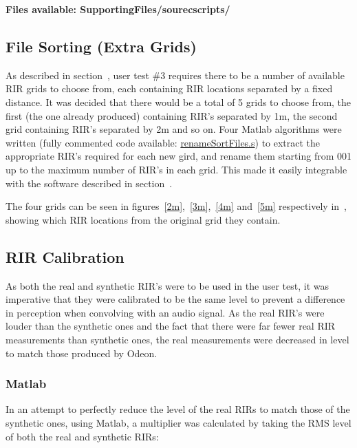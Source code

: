 \documentclass[../../main.tex]{subfiles}
\begin{document}
			\textbf{Files available: SupportingFiles/sourecscripts/}

	\subsection{File Sorting (Extra Grids)}
	\label{odeon:grids}
		As described in section~, user test \#3 requires there to be a number of available \ac{RIR} grids to choose from, each containing \ac{RIR} locations separated by a fixed distance. It was decided that there would be a total of 5 grids to choose from, the first (the one already produced) containing \ac{RIR}'s separated by 1m, the second grid containing \ac{RIR}'s separated by 2m and so on.	 Four Matlab algorithms were written (fully commented code available: \href{http://lt669.github.io/code/matlab/html/renameSortFiles.html}{renameSortFiles.s})  to extract the appropriate \ac{RIR}'s required for each new gird, and rename them starting from 001 up to the maximum number of \ac{RIR}'s in each grid. This made it easily  integrable with the software described in section~.

		The four grids can be seen in figures~\ref{2m},~\ref{3m},~\ref{4m} and~\ref{5m} respectively in~, showing which \ac{RIR} locations from the original grid they contain.


	\subsection{RIR Calibration}
		
		As both the real and synthetic \ac{RIR}'s were to be used in the user test, it was imperative that they were calibrated to be the same level to prevent a difference in perception when convolving with an audio signal. As the real \ac{RIR}'s were louder than the synthetic ones and the fact that there were far fewer real \ac{RIR} measurements than synthetic ones, the real measurements were decreased in level to match those produced by Odeon.

		\subsubsection{Matlab}

		In an attempt to perfectly reduce the level of the real \ac{RIRs} to match those of the synthetic ones, using Matlab, a multiplier was calculated by taking the RMS level of both the real and synthetic \ac{RIRs}:
\end{document}
